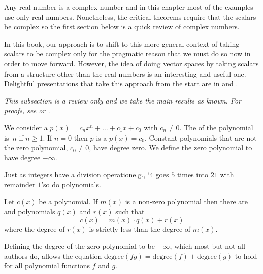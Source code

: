 Any real number is a complex number and
in this chapter most of the examples use
only real numbers.
Nonetheless, the critical theorems require that the scalars be complex so
the first section below is a quick review of complex numbers.

In this book, our approach is to shift to this more general context 
of taking scalars to be complex only for the 
pragmatic reason that we must do so now in order to 
move forward.
However, the idea of doing vector spaces 
by taking scalars from a structure other than the real
numbers is an interesting and useful one.
Delightful presentations that take this approach from the start are in
\cite{Halmos} and \cite{HoffmanKunze}.






\textit{This subsection is a review only and we take the main results as known.
  For proofs, see \cite{BirkhoffMaclane} or \cite{Ebbinghaus}.}

We consider a  
$p(x)=c_nx^n+\dots+c_1x+c_0$ with 
$c_n\neq 0$.
The 
of the polynomial is~$n$ if $n\geq 1$.
If $n=0$ then $p$ is a 
 $p(x)=c_0$. 
Constant polynomials that are not the zero polynomial, $c_0\neq 0$, 
have degree zero.
We define the zero polynomial to have degree 
$-\infty$.

Just as integers have a division operation\Dash e.g., 
`\( 4 \) goes \( 5 \) times into \( 21 \) with remainder \( 1 \)'\Dash so 
do polynomials.

\begin{theorem}
\label{th:EuclidForPolys}
Let \( c(x) \) be a polynomial.
If \( m(x) \) is a non-zero polynomial then there are  and
 polynomials \( q(x) \) and \( r(x) \) such that
\begin{equation*}
  c(x)=m(x)\cdot q(x)+r(x)
\end{equation*}
where the degree of \( r(x) \) is strictly less than the degree of \( m(x) \).
\end{theorem}

\begin{remark}
Defining 
the degree of the zero polynomial to be $-\infty$, 
which most but not all authors do, 
allows the equation $\text{degree}(fg)=\text{degree}(f)+\text{degree}(g)$
to hold for all polynomial functions $f$ and $g$.
\end{remark}

